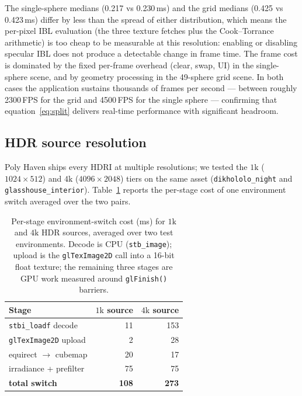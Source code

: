 \documentclass{egpubl}
\begin{document}
The single-sphere medians (0.217 vs 0.230\,ms) and the grid medians
(0.425 vs 0.423\,ms) differ by less than the spread of either
distribution, which means the per-pixel IBL evaluation (the three
texture fetches plus the Cook--Torrance arithmetic) is too cheap to be
measurable at this resolution: enabling or disabling specular IBL does
not produce a detectable change in frame time. The frame cost is
dominated by the fixed per-frame overhead (clear, swap, UI) in the
single-sphere scene, and by geometry processing in the 49-sphere grid
scene. In both cases the application sustains thousands of frames per
second --- between roughly 2300\,FPS for the grid and 4500\,FPS for the
single sphere --- confirming that equation~\eqref{eq:split} delivers
real-time performance with significant headroom.

\subsection{HDR source resolution}\label{sec:sourceres}

Poly Haven ships every HDRI at multiple resolutions; we tested the $1\text{k}$
($1024\!\times\!512$) and $4\text{k}$ ($4096\!\times\!2048$) tiers on the same
asset (\texttt{dikhololo\_night} and \texttt{glasshouse\_interior}).
Table~\ref{tab:sourceres} reports the per-stage cost of one environment switch
averaged over the two pairs.

\begin{table}[t]
\centering
\caption{Per-stage environment-switch cost (ms) for $1\text{k}$ and $4\text{k}$
HDR sources, averaged over two test environments. Decode is CPU
(\texttt{stb\_image}); upload is the \texttt{glTexImage2D} call into a 16-bit
float texture; the remaining three stages are GPU work measured around
\texttt{glFinish()} barriers.}
\label{tab:sourceres}
\small
\begin{tabular}{lrr}
\toprule
Stage              & $1\text{k}$ source & $4\text{k}$ source \\
\midrule
\texttt{stbi\_loadf} decode    &  \phantom{0}11 &  153 \\
\texttt{glTexImage2D} upload   &  \phantom{00}2 & \phantom{0}28 \\
equirect $\rightarrow$ cubemap &  \phantom{0}20 & \phantom{0}17 \\
irradiance + prefilter         &  \phantom{0}75 & \phantom{0}75 \\
\midrule
\textbf{total switch}          & \textbf{108} & \textbf{273} \\
\bottomrule
\end{tabular}
\end{table}
\end{document}
